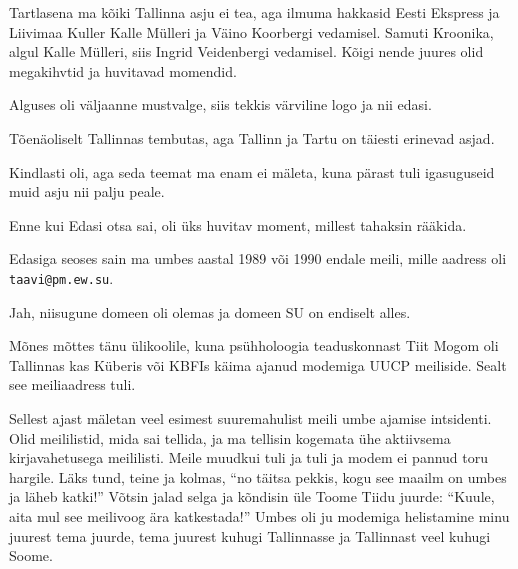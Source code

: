 Tartlasena ma kõiki Tallinna asju ei tea, aga ilmuma hakkasid Eesti Ekspress ja 
Liivimaa Kuller Kalle Mülleri ja Väino 
Koorbergi vedamisel. Samuti Kroonika, algul Kalle 
Mülleri, siis Ingrid Veidenbergi vedamisel. 
Kõigi nende juures olid megakihvtid ja huvitavad momendid. 

Alguses oli väljaanne mustvalge, siis tekkis värviline logo ja nii edasi.


Tõenäoliselt Tallinnas tembutas, aga Tallinn ja Tartu on täiesti erinevad asjad.


Kindlasti oli, aga seda teemat ma enam ei mäleta, kuna pärast tuli igasuguseid muid asju nii palju peale.


Enne kui Edasi otsa sai, oli üks huvitav moment, millest 
tahaksin rääkida. 

Edasiga seoses sain ma umbes aastal 1989 või 1990 endale meili, mille aadress oli 
\verb|taavi@pm.ew.su|.


Jah, niisugune domeen oli olemas ja domeen SU on endiselt alles.


Mõnes mõttes tänu ülikoolile, kuna psühholoogia 
teaduskonnast Tiit 
Mogom oli Tallinnas kas Küberis või 
KBFIs käima ajanud modemiga UUCP 
meiliside. Sealt see meiliaadress tuli. 

Sellest ajast mäletan veel esimest suuremahulist meili umbe 
ajamise intsidenti. Olid meililistid, mida sai tellida, ja 
ma tellisin kogemata ühe aktiivsema kirjavahetusega meililisti. Meile 
muudkui tuli ja tuli ja modem ei pannud toru hargile. Läks tund, teine ja kolmas, \enquote{no täitsa pekkis, kogu see 
maailm on umbes ja läheb katki!} Võtsin jalad selga ja kõndisin üle Toome 
Tiidu juurde: \enquote{Kuule, aita mul see meilivoog 
ära katkestada!} Umbes oli ju modemiga helistamine minu juurest tema juurde, 
tema juurest kuhugi Tallinnasse ja Tallinnast veel kuhugi Soome.

